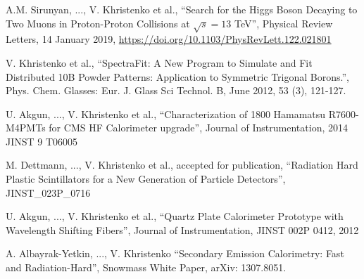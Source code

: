 \documentclass[10pt, letterpaper]{deps1}
\begin{document}
\vspace{5pt}
\\
\\
\\
\\
\\
\vspace{5pt}
\small{\begin{tightitemize}
    \item A.M. Sirunyan, ..., V. Khristenko et al., ``Search for the Higgs Boson Decaying to Two Muons in Proton-Proton Collisions at $\sqrt{s}=13$ TeV'', Physical Review Letters, 14 January 2019, \url{https://doi.org/10.1103/PhysRevLett.122.021801}
    \item V. Khristenko et al., ``SpectraFit: A New Program to Simulate and Fit Distributed 10B Powder Patterns: Application to Symmetric Trigonal Borons.'', Phys. Chem. Glasses: Eur. J. Glass Sci Technol. B, June 2012, 53 (3), 121-127.
    \item U. Akgun, ..., V. Khristenko et al., ``Characterization of 1800 Hamamatsu R7600-M4PMTs for CMS HF Calorimeter upgrade'', Journal of Instrumentation, 2014 JINST 9 T06005
    \item M. Dettmann, ..., V. Khristenko et al., accepted for publication, ``Radiation Hard Plastic Scintillators for a New Generation of Particle Detectors'', JINST\_023P\_0716
    \item U. Akgun, ..., V. Khristenko et al., ``Quartz Plate Calorimeter Prototype with Wavelength Shifting Fibers'', Journal of Instrumentation, JINST 002P 0412, 2012
    \item A. Albayrak-Yetkin, ..., V. Khristenko ``Secondary Emission Calorimetry: Fast and Radiation-Hard'', Snowmass White Paper, arXiv: 1307.8051.
\end{tightitemize}}
\end{document}
